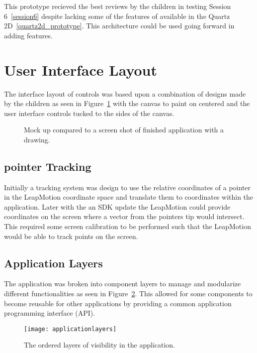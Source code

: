 This prototype recieved the best reviews by the children in testing Session 6~\ref{session6} despite lacking some of the features of available in the Quartz 2D~\ref{quartz2d_prototype}. This architecture could be used going forward in adding features. 


\section{User Interface Layout}
The interface layout of controls was based upon a combination of designs made by the children as seen in Figure~\ref{fig:LeapPaintScreenshot} with the canvas to paint on centered and the user interface controls tucked to the sides of the canvas. 


\begin{figure}
\centering     %
{}
\caption{Mock up compared to a screen shot of finished application with a drawing. }
\label{fig:LeapPaintScreenshot}
\end{figure}



\subsection{pointer Tracking}
Initially a tracking system was design to use the relative coordinates of a pointer in the LeapMotion coordinate space and translate them to coordinates within the application. Later with the an SDK update the LeapMotion could provide coordinates on the screen where a vector from the pointers tip would intersect. This required some screen calibration to be performed such that the LeapMotion would be able to track points on the screen. 

\subsection{Application Layers}
The application was broken into component layers to manage and modularize different functionalities as seen in Figure~\ref{fig:applicationlayers}. This allowed for some components to become reusable for other applications by providing a common application programming interface (API). 

\begin{figure}
\centering
\texttt{[image: applicationlayers]}
\caption{The ordered layers of visibility in the application. }
\label{fig:applicationlayers}
\end{figure}

